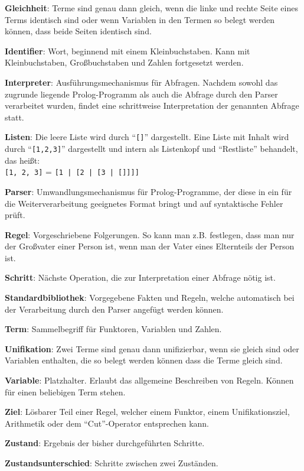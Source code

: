 \documentclass[parskip=full,11pt,twoside]{scrartcl}
\begin{document}
\textbf{Gleichheit}:
Terme sind genau dann gleich, wenn die linke und rechte Seite eines Terms identisch sind oder wenn Variablen in den Termen so belegt werden können, dass beide Seiten identisch sind.

\textbf{Identifier}:
Wort, beginnend mit einem Kleinbuchstaben. Kann mit Kleinbuchstaben, Großbuchstaben und Zahlen fortgesetzt werden.

\textbf{Interpreter}:
Ausführungsmechanismus für Abfragen. Nachdem sowohl das zugrunde liegende Prolog-Programm als auch die Abfrage durch den Parser verarbeitet wurden, findet eine schrittweise Interpretation der genannten Abfrage statt.

\textbf{Listen}:
Die leere Liste wird durch \enquote{\texttt{[]}} dargestellt. Eine Liste mit Inhalt wird durch \enquote{\texttt{[1,2,3]}} dargestellt und intern als Listenkopf und \enquote{Restliste} behandelt, das heißt:\\
\texttt{[1, 2, 3]} = \texttt{[1 | [2 | [3 | []]]]}

\textbf{Parser}:
Umwandlungsmechanismus für Prolog-Programme, der diese in ein für die Weiterverarbeitung geeignetes Format bringt und auf syntaktische Fehler prüft.

\textbf{Regel}:
Vorgeschriebene Folgerungen. So kann man z.B. festlegen, dass man nur der Großvater einer Person ist, wenn man der Vater eines Elternteils der Person ist.

\textbf{Schritt}:
Nächste Operation, die zur Interpretation einer Abfrage nötig ist.

\textbf{Standardbibliothek}:
Vorgegebene Fakten und Regeln, welche automatisch bei der Verarbeitung durch den Parser angefügt werden können.

\textbf{Term}:
Sammelbegriff für Funktoren, Variablen und Zahlen.

\textbf{Unifikation}:
Zwei Terme sind genau dann unifizierbar, wenn sie gleich sind oder Variablen enthalten, die so belegt werden können dass die Terme gleich sind.

\textbf{Variable}:
Platzhalter. Erlaubt das allgemeine Beschreiben von Regeln. Können für einen beliebigen Term stehen.

\textbf{Ziel}:
Lösbarer Teil einer Regel, welcher einem Funktor, einem Unifikationsziel, Arithmetik oder dem \enquote{Cut}-Operator entsprechen kann.

\textbf{Zustand}:
Ergebnis der bisher durchgeführten Schritte.

\textbf{Zustandsunterschied}:
Schritte zwischen zwei Zuständen.
\end{document}
